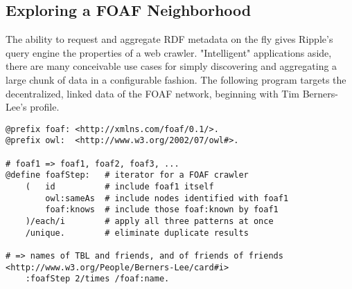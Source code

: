 \documentclass[runningheads]{llncs}
\begin{document}
\subsection{Exploring a FOAF Neighborhood}
The ability to request and aggregate RDF metadata on the fly gives Ripple's query engine the properties of a web crawler.  "Intelligent" applications aside, there are many conceivable use cases for simply discovering and aggregating a large chunk of data in a configurable fashion.  The following program targets the decentralized, linked data of the FOAF network, beginning with Tim Berners-Lee's profile.
\begin{verbatim}
@prefix foaf: <http://xmlns.com/foaf/0.1/>.
@prefix owl:  <http://www.w3.org/2002/07/owl#>.

# foaf1 => foaf1, foaf2, foaf3, ...
@define foafStep:   # iterator for a FOAF crawler
    (   id          # include foaf1 itself
        owl:sameAs  # include nodes identified with foaf1
        foaf:knows  # include those foaf:known by foaf1
    )/each/i        # apply all three patterns at once
    /unique.        # eliminate duplicate results

# => names of TBL and friends, and of friends of friends
<http://www.w3.org/People/Berners-Lee/card#i>
    :foafStep 2/times /foaf:name.
\end{verbatim}
\end{document}
